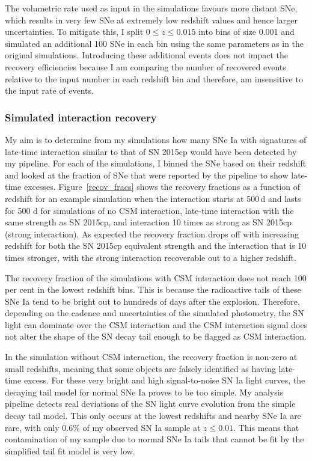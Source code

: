 \documentclass[a4paper,oneside,12pt, class=Latex/Classes/PhDthesisPSnPDF, crop=false]{standalone}
\begin{document}
The volumetric rate used as input in the simulations favours more distant SNe, which results in very few SNe at extremely low redshift values and hence larger uncertainties. To mitigate this, I split $0\leq z\leq 0.015$ into bins of size 0.001 and simulated an additional 100 SNe in each bin using the same parameters as in the original simulations. Introducing these additional events does not impact the recovery efficiencies because I am comparing the number of recovered events relative to the input number in each redshift bin and therefore, am insensitive to the input rate of events.


\subsubsection{Simulated interaction recovery}
\label{simulated_reco}
My aim is to determine from my simulations how many SNe Ia with signatures of late-time interaction similar to that of SN 2015cp would have been detected by my pipeline. For each of the simulations, I binned the SNe based on their redshift and looked at the fraction of SNe that were reported by the pipeline to show late-time excesses. Figure~\ref{recov_fracs} shows the recovery fractions as a function of redshift for an example simulation when the interaction starts at 500\,d and lasts for 500 d for simulations of no CSM interaction, late-time interaction with the same strength as SN 2015cp, and interaction 10 times as strong as SN 2015cp (strong interaction). As expected the recovery fraction drops off with increasing redshift for both the SN 2015cp equivalent strength and the interaction that is 10 times stronger, with the strong interaction recoverable out to a higher redshift.

The recovery fraction of the simulations with CSM interaction does not reach 100 per cent in the lowest redshift bins. This is because the radioactive tails of these SNe Ia tend to be bright out to hundreds of days after the explosion. Therefore, depending on the cadence and uncertainties of the simulated photometry, the SN light can dominate over the CSM interaction and the CSM interaction signal does not alter the shape of the SN decay tail enough to be flagged as CSM interaction.

In the simulation without CSM interaction, the recovery fraction is non-zero at small redshifts, meaning that some objects are falsely identified as having late-time excess. For these very bright and high signal-to-noise SN Ia light curves, the decaying tail model for normal SNe Ia proves to be too simple. My analysis pipeline detects real deviations of the SN light curve evolution from the simple decay tail model. This only occurs at the lowest redshifts and nearby SNe Ia are rare, with only 0.6\% of my observed SN Ia sample at $z\leq0.01$. This means that contamination of my sample due to normal SNe Ia tails that cannot be fit by the simplified tail fit model is very low.
\end{document}
